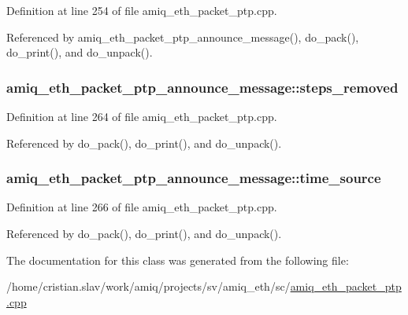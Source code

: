 Definition at line 254 of file amiq\_\-eth\_\-packet\_\-ptp.cpp.

Referenced by amiq\_\-eth\_\-packet\_\-ptp\_\-announce\_\-message(), do\_\-pack(), do\_\-print(), and do\_\-unpack().\hypertarget{classamiq__eth__packet__ptp__announce__message_a3bbde8f5edb3a9b9b606a489620375a8}{
\subsubsection[{steps\_\-removed}]{ {\bf amiq\_\-eth\_\-packet\_\-ptp\_\-announce\_\-message::steps\_\-removed}}}
\label{classamiq__eth__packet__ptp__announce__message_a3bbde8f5edb3a9b9b606a489620375a8}


Definition at line 264 of file amiq\_\-eth\_\-packet\_\-ptp.cpp.

Referenced by do\_\-pack(), do\_\-print(), and do\_\-unpack().\hypertarget{classamiq__eth__packet__ptp__announce__message_a1cbc8a5fe3f254291ec7787daf4c1054}{
\subsubsection[{time\_\-source}]{ {\bf amiq\_\-eth\_\-packet\_\-ptp\_\-announce\_\-message::time\_\-source}}}
\label{classamiq__eth__packet__ptp__announce__message_a1cbc8a5fe3f254291ec7787daf4c1054}


Definition at line 266 of file amiq\_\-eth\_\-packet\_\-ptp.cpp.

Referenced by do\_\-pack(), do\_\-print(), and do\_\-unpack().

The documentation for this class was generated from the following file:\begin{DoxyCompactItemize}
\item 
/home/cristian.slav/work/amiq/projects/sv/amiq\_\-eth/sc/\hyperlink{amiq__eth__packet__ptp_8cpp}{amiq\_\-eth\_\-packet\_\-ptp.cpp}\end{DoxyCompactItemize}
